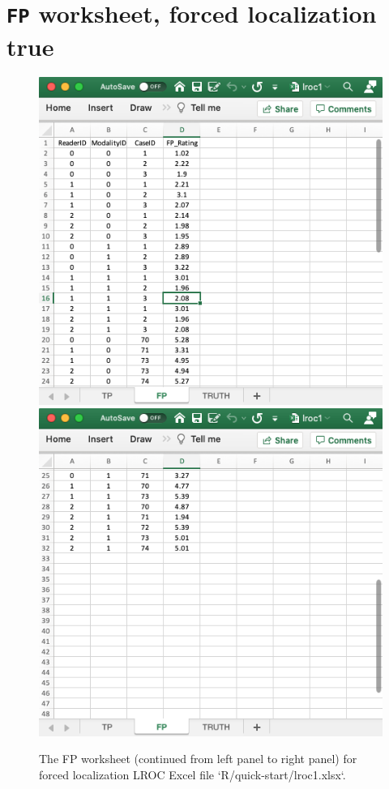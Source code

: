 \documentclass[
]{book}
\begin{document}
\hypertarget{quick-start-lroc-fp1}{%
\section{\texorpdfstring{\texttt{FP} worksheet, forced localization true}{FP worksheet, forced localization true}}\label{quick-start-lroc-fp1}}

\begin{figure}

{\centering \includegraphics[width=0.5\linewidth]{images/quick-start/lroc1FP1} \includegraphics[width=0.5\linewidth]{images/quick-start/lroc1FP2} 

}

\caption{The FP worksheet (continued from left panel to right panel) for forced localization LROC Excel file `R/quick-start/lroc1.xlsx`.}\label{fig:quick-start-lroc-fp1}
\end{figure}
\end{document}
